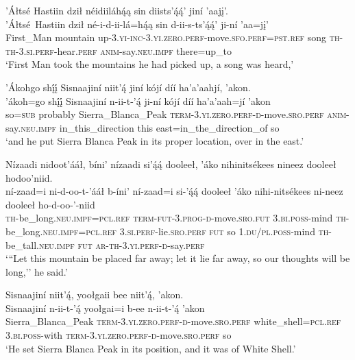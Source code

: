 \ea\label{ex:text4-9-1}
’Áłtsé Hastiin dził néidiiláhą́ą sin diists’ą́ą́’ jiní ’aajį’.\\
\gll ’Áłtsé~{Hastiin}	dził	né-i-d-ii-lá=hą́ą	sin	d-ii-s-ts’ą́ą́’	ji-ní	’aa=jį’\\
     First\_Man	mountain	up-3.\textsc{yi}-\textsc{inc}-3.\textsc{yi}.\textsc{zero}.\textsc{perf}-move.\textsc{sfo}.\textsc{perf}=\textsc{pst}.\textsc{ref}	song	\textsc{th}-\textsc{th}-3.\textsc{si}.\textsc{perf}-hear.\textsc{perf}	\textsc{anim}-say.\textsc{neu}.\textsc{impf}	there=up\_to\\
\glt `First Man took the mountains he had picked up, a song was heard,'
\z

\ea\label{ex:text4-9-2}
’Ákohgo shį́į́ Sisnaajiní niit’ą́ jiní kójí díí ha’a’aahjí, ’akon.\\
\gll ’ákoh=go	shį́į́	Sisnaajiní	n-ii-t-’ą́	ji-ní	kójí	díí	ha’a’aah=jí	’akon\\
     so=\textsc{sub}	probably	Sierra\_Blanca\_Peak	\textsc{term}-3.\textsc{yi}.\textsc{zero}.\textsc{perf}-\textsc{d}-move.\textsc{sro}.\textsc{perf}	\textsc{anim}-say.\textsc{neu}.\textsc{impf}	in\_this\_direction	this	east=in\_the\_direction\_of	so\\
\glt `and he put Sierra Blanca Peak in its proper location, over in the east.'
\z

\ea\label{ex:text4-9-3}
Nízaadi nidoot’ááł, bíni’ nízaadi si’ą́ą́ dooleeł, ’áko nihinitsékees nineez dooleeł hodoo’niid.\\
\gll ní-zaad=i	ni-d-oo-t-’ááł	b-íni’	ní-zaad=i	si-’ą́ą́	dooleeł	’áko	nihi-nitsékees	ni-neez	dooleeł	ho-d-oo-’-niid\\
     \textsc{th}-be\_long.\textsc{neu}.\textsc{impf}=\textsc{pcl}.\textsc{ref}	\textsc{term}-\textsc{fut}-3.\textsc{prog}-\textsc{d}-move.\textsc{sro}.\textsc{fut}	3.\textsc{bi}.\textsc{poss}-mind	\textsc{th}-be\_long.\textsc{neu}.\textsc{impf}=\textsc{pcl}.\textsc{ref}	3.\textsc{si}.\textsc{perf}-lie.\textsc{sro}.\textsc{perf}	\textsc{fut}	so	1.\textsc{du}/\textsc{pl}.\textsc{poss}-mind	\textsc{th}-be\_tall.\textsc{neu}.\textsc{impf}	\textsc{fut}	\textsc{ar}-\textsc{th}-3.\textsc{yi}.\textsc{perf}-\textsc{d}-say.\textsc{perf}\\
\glt `{``}Let this mountain be placed far away; let it lie far away, so our thoughts will be long,'' he said.'
\z

\ea\label{ex:text4-9-4}
Sisnaajiní niit’ą́, yoołgaii bee niit’ą́, ’akon.\\
\gll Sisnaajiní	n-ii-t-’ą́	yoołgai=i	b-ee	n-ii-t-’ą́	’akon\\
     Sierra\_Blanca\_Peak	\textsc{term}-3.\textsc{yi}.\textsc{zero}.\textsc{perf}-\textsc{d}-move.\textsc{sro}.\textsc{perf}	white\_shell=\textsc{pcl}.\textsc{ref}	3.\textsc{bi}.\textsc{poss}-with	\textsc{term}-3.\textsc{yi}.\textsc{zero}.\textsc{perf}-\textsc{d}-move.\textsc{sro}.\textsc{perf}	so\\
\glt `He set Sierra Blanca Peak in its position, and it was of White Shell.'
\z

